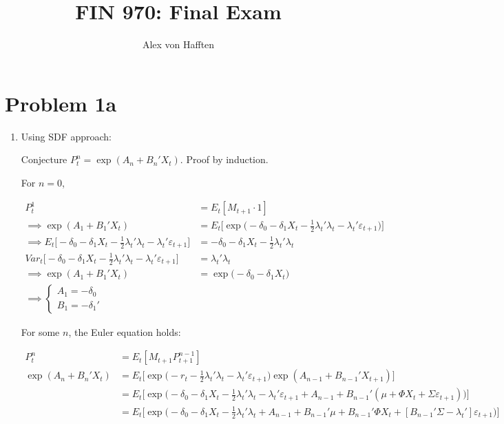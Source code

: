 \documentclass{article}
\title{FIN 970: Final Exam}
\author{Alex von Hafften}
\begin{document}
\maketitle

\section{Problem 1a}

\begin{enumerate}

\item Using SDF approach:

Conjecture $P_t^n = \exp(A_n + B_n'X_t)$. Proof by induction.

For $n=0$,

\begin{align*}
P_t^1 
&= 
E_t[M_{t+1} \cdot 1]\\
\implies\exp(A_1 + B_1'X_t) 
&= 
E_t \Bigg[ \exp \Bigg(-\delta_0 - \delta_1 X_t - \frac{1}{2} \lambda_t'\lambda_t - \lambda_t' \varepsilon_{t+1}\Bigg) \Bigg]\\
\implies E_t \Bigg[ -\delta_0 - \delta_1 X_t - \frac{1}{2} \lambda_t'\lambda_t - \lambda_t' \varepsilon_{t+1} \Bigg]
&= -\delta_0 -\delta_1 X_t - \frac{1}{2}\lambda_t'\lambda_t \\
Var_t\Bigg[ -\delta_0 - \delta_1 X_t - \frac{1}{2} \lambda_t'\lambda_t - \lambda_t' \varepsilon_{t+1} \Bigg]
&= \lambda_t'\lambda_t\\
\implies
\exp(A_1 + B_1'X_t) 
&= 
\exp \Bigg(-\delta_0 - \delta_1 X_t\Bigg) \\
\implies
\begin{cases}
A_1 = -\delta_0\\
B_1 = -\delta_1'
\end{cases}
\end{align*}


For some $n$, the Euler equation holds:

\begin{align*}
P_t^n &= E_t[M_{t+1} P_{t+1}^{n-1}]\\
\exp(A_{n} + B_{n}'X_{t})
&= E_t \Bigg[\exp \Bigg(-r_t - \frac{1}{2} \lambda_t'\lambda_t - \lambda_t' \varepsilon_{t+1}\Bigg) \exp(A_{n-1} + B_{n-1}'X_{t+1})\Bigg]\\
&= E_t \Bigg[\exp \Bigg(-\delta_0 - \delta_1 X_t - \frac{1}{2} \lambda_t'\lambda_t - \lambda_t' \varepsilon_{t+1} + A_{n-1} + B_{n-1}'(\mu + \Phi X_t + \Sigma \varepsilon_{t+1} ) \Bigg)\Bigg]\\
&= E_t \Bigg[\exp \Bigg(-\delta_0 - \delta_1 X_t - \frac{1}{2} \lambda_t'\lambda_t  + A_{n-1} + B_{n-1}'\mu + B_{n-1}'\Phi X_t + [B_{n-1}'\Sigma - \lambda_t'] \varepsilon_{t+1}  \Bigg)\Bigg]
\end{align*}


\end{enumerate}
\end{document}
